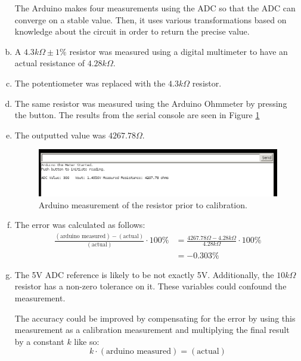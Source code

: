\documentclass[12pt]{article}
\begin{document}
\begin{enumerate}[a.]
    The Arduino makes four measurements using the ADC so that the ADC can converge on a stable 
    value. Then, it uses various transformations based on knowledge about the circuit in order to 
    return the precise value. 
    \item A $4.3k\Omega\pm1\%$ resistor was measured using a digital multimeter to have 
    an actual resistance of $4.28k\Omega$.
    \item The potentiometer was replaced with the $4.3k\Omega$ resistor.
    \item The same resistor was measured using the Arduino Ohmmeter by pressing the button. 
    The results from the serial console are seen in Figure \ref{fig:meas1}
    \item The outputted value was $4267.78\Omega$.
    \begin{figure}[H]
      \centering
      \includegraphics[width=\linewidth]{meas1.png}
      \caption{Arduino measurement of the resistor prior to calibration.}
      \label{fig:meas1}
    \end{figure}

    \item The error was calculated as follows: 
    \begin{equation}
        \begin{aligned}
            \frac{(\text{arduino measured}) - (\text{actual})}{(\text{actual})} \cdot 100 \% 
            &= \frac{4267.78\Omega - 4.28k\Omega}{4.28k\Omega} \cdot 100\% \\
            &= \mathbf{-0.303\%}
        \end{aligned}
    \end{equation}
    \item The 5V ADC reference is likely to be not exactly 5V. Additionally, the $10k\Omega$ 
    resistor has a non-zero tolerance on it. These variables could confound the measurement.
    
    The accuracy could be improved by compensating for the error by using this measurement 
    as a calibration measurement and multiplying the final result by a constant $k$ like so:
    \begin{equation}
        k\cdot (\text{arduino measured}) = (\text{actual})
    \end{equation}


\end{enumerate}
\end{document}
